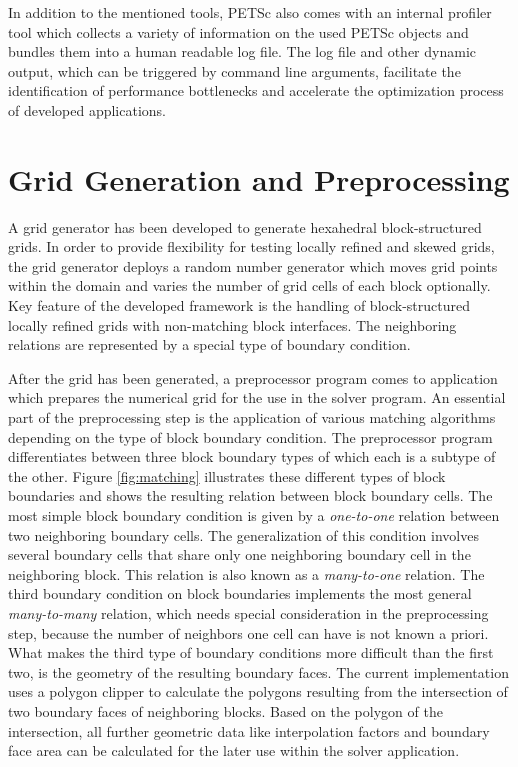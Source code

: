 In addition to the mentioned tools, PETSc also comes with an internal profiler tool which collects a variety of information on the used PETSc objects and bundles them into a human readable log file. The log file and other dynamic output, which can be triggered by command line arguments, facilitate the identification of performance bottlenecks and accelerate the optimization process of developed applications.

\section{Grid Generation and Preprocessing}
\label{sec:gridpreproc}

A grid generator has been developed to generate hexahedral block-structured grids. In order to provide flexibility for testing locally refined and skewed grids, the grid generator deploys a random number generator which moves grid points within the domain and varies the number of grid cells of each block optionally. Key feature of the developed framework is the handling of block-structured locally refined grids with non-matching block interfaces. The neighboring relations are represented by a special type of boundary condition.

After the grid has been generated, a preprocessor program comes to application which prepares the numerical grid for the use in the solver program. An essential part of the preprocessing step is the application of various matching algorithms depending on the type of block boundary condition. The preprocessor program differentiates between three block boundary types of which each is a subtype of the other. Figure \ref{fig:matching} illustrates these different types of block boundaries and shows the resulting relation between block boundary cells. The most simple block boundary condition is given by a \emph{one-to-one} relation between two neighboring boundary cells. The generalization of this condition involves several boundary cells that share only one neighboring boundary cell in the neighboring block. This relation is also known as a \emph{many-to-one} relation. The third boundary condition on block boundaries implements the most general \emph{many-to-many} relation, which needs special consideration in the preprocessing step, because the number of neighbors one cell can have is not known a priori. What makes the third type of boundary conditions more difficult than the first two, is the geometry of the resulting boundary faces. The current implementation uses a polygon clipper to calculate the polygons resulting from the intersection of two boundary faces of neighboring blocks. Based on the polygon of the intersection, all further geometric data like interpolation factors and boundary face area can be calculated for the later use within the solver application.

